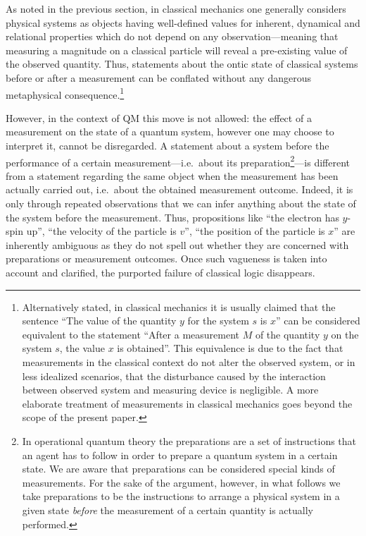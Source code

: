 \documentclass[11pt, executivepaper]{article}
\begin{document}
As noted in the previous section, in classical mechanics one generally considers physical systems as objects having well-defined values for inherent, dynamical and relational properties which do not depend on any observation---meaning that measuring a magnitude on a classical particle will reveal a pre-existing value of the observed quantity. Thus, statements about the ontic state of classical systems before or after a measurement can be conflated without any dangerous metaphysical consequence.\footnote{Alternatively stated, in classical mechanics it is usually claimed that the sentence ``The value of the quantity $y$ for the system $s$ is $x$'' can be considered equivalent to the statement ``After a measurement $M$ of the quantity $y$ on the system $s$, the value $x$ is obtained''. This equivalence is due to the fact that measurements in the classical context do not alter the observed system, or in less idealized scenarios, that the disturbance caused by the interaction between observed system and measuring device is negligible. A more elaborate treatment of measurements in classical mechanics goes beyond the scope of the present paper.}

However, in the context of QM this move is not allowed: the effect of a measurement on the state of a quantum system, however one may choose to interpret it, cannot be disregarded. A statement about a system before the performance of a certain measurement---i.e.\ about its preparation\footnote{In operational quantum theory the preparations are a set of instructions that an agent has to follow in order to prepare a quantum system in a certain state. We are aware that preparations can be considered special kinds of measurements. For the sake of the argument, however, in what follows we take preparations to be the instructions to arrange a physical system in a given state \emph{before} the measurement of a certain quantity is actually performed.}---is different from a statement regarding the same object when the measurement has been actually carried out, i.e.\ about the obtained measurement outcome. Indeed, it is only through repeated observations that we can infer anything about the state of the system before the measurement. Thus, propositions like ``the electron has $y$-spin up'', ``the velocity of the particle is $v$'', ``the position of the particle is $x$'' are inherently ambiguous as they do not spell out whether they are concerned with preparations or measurement outcomes. Once such vagueness is taken into account and clarified, the purported failure of classical logic disappears.
\end{document}
